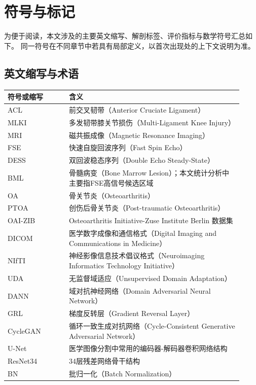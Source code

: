 
\chapter{符号与标记}
\label{app:symbols}

为便于阅读，本文涉及的主要英文缩写、解剖标签、评价指标与数学符号汇总如下。
同一符号在不同章节中若具有局部定义，以首次出现处的上下文说明为准。

\section{英文缩写与术语}
\begin{longtable}{p{0.24\linewidth}p{0.68\linewidth}}
  \toprule
  符号或缩写 & 含义 \\
  \midrule
  ACL & 前交叉韧带（Anterior Cruciate Ligament） \\
  MLKI & 多发韧带膝关节损伤（Multi-Ligament Knee Injury） \\
  MRI & 磁共振成像（Magnetic Resonance Imaging） \\
  FSE & 快速自旋回波序列（Fast Spin Echo） \\
  DESS & 双回波稳态序列（Double Echo Steady-State） \\
  BML & 骨髓病变（Bone Marrow Lesion）；本文统计分析中主要指FSE高信号候选区域 \\
  OA & 骨关节炎（Osteoarthritis） \\
  PTOA & 创伤后骨关节炎（Post-traumatic Osteoarthritis） \\
  OAI-ZIB & Osteoarthritis Initiative-Zuse Institute Berlin 数据集 \\
  DICOM & 医学数字成像和通信格式（Digital Imaging and Communications in Medicine） \\
  NIfTI & 神经影像信息技术倡议格式（Neuroimaging Informatics Technology Initiative） \\
  UDA & 无监督域适应（Unsupervised Domain Adaptation） \\
  DANN & 域对抗神经网络（Domain Adversarial Neural Network） \\
  GRL & 梯度反转层（Gradient Reversal Layer） \\
  CycleGAN & 循环一致生成对抗网络（Cycle-Consistent Generative Adversarial Network） \\
  U-Net & 医学图像分割中常用的编码器-解码器卷积网络结构 \\
  ResNet34 & 34层残差网络骨干结构 \\
  BN & 批归一化（Batch Normalization） \\

\end{longtable}
